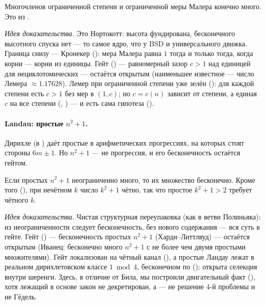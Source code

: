 \begin{theorem}\label{thm:mahler_northcott_shadow}
\green{} Многочленов ограниченной степени и ограниченной меры Малера конечно много. Это
 из .
\end{theorem}

\emph{Идея доказательства.} Это Нортокотт: высота фундирована, бесконечного высотного спуска нет — то
самое ядро, что у BSD и универсального движка. Граница снизу — Кронекер ():
мера Малера равна $1$ тогда и только тогда, когда корни — корни из единицы. Гейт
 (\red{}) — равномерный зазор $c>1$ над единицей для нециклотомических —
остаётся открытым (наименьшее известное — число Лемера $\approx 1.17628$). Лемер при ограниченной
степени уже зелён (): для каждой степени есть $c>1$ без мер в
$(1,c)$; но $c=c(n)$ зависит от степени, а единая $c$ на все степени (,
\red{}) — и есть сама гипотеза ().

\paragraph{Landau: простые $n^2+1$.}
Дирихле (в ) даёт простые в арифметических прогрессиях, на которых стоят стороны
$6m\pm1$. Но $n^2+1$ — не прогрессия, и его бесконечность остаётся гейтом.

\begin{theorem}\label{thm:landauPrimes_infinite_of_unbounded}
\green{} Если простых $n^2+1$ неограниченно много, то их множество бесконечно. Кроме того
(), при нечётном $k$ число $k^2+1$ чётно, так что простое $k^2+1>2$
требует чётного $k$.
\end{theorem}

\emph{Идея доказательства.} Чистая структурная переупаковка (как в ветви Полиньяка): из
неограниченности следует бесконечность, без нового содержания — вся суть в гейте. Гейт
 (\red{}) — бесконечность простых $n^2+1$ (Харди–Литтлвуд) — остаётся
открытым (Иванец: бесконечно много $n^2+1$ с не более чем двумя простыми множителями). Гейт
локализован на чётный канал (), а простые Ландау лежат в реальном
дирихлетовском классе $1\bmod 4$, бесконечном по 
(); открыта селекция внутри шеренги. Здесь, в отличие от
Била, мы построили двигательный факт (), хотя лежащий в основе
закон  не декретирован, а  — не решение
4-й проблемы и не Гёдель.


